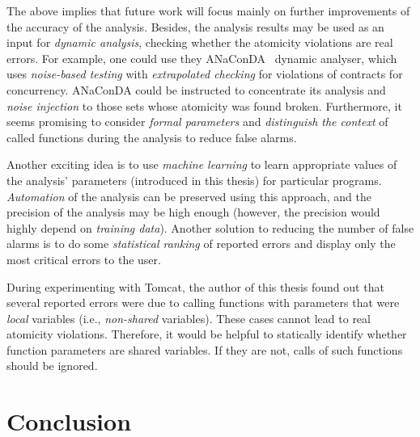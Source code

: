 The above implies that future work will focus mainly on further improvements of the accuracy of the analysis. Besides, the analysis results may be used as an input for \emph{dynamic analysis}, checking whether the atomicity violations are real errors. For example, one could use they ANaConDA~\cite{anaconda} dynamic analyser, which uses \emph{noise-based testing} with \emph{extrapolated checking} for violations of contracts for concurrency. ANaConDA could be instructed to concentrate its analysis and \emph{noise injection} to those sets whose atomicity was found broken. Furthermore, it seems promising to consider \emph{formal parameters} and \emph{distinguish the context} of called functions during the analysis to reduce false alarms.

Another exciting idea is to use \emph{machine learning} to learn appropriate values of the analysis' parameters (introduced in this thesis) for particular programs. \emph{Automation} of the analysis can be preserved using this approach, and the precision of the analysis may be high enough (however, the precision would highly depend on \emph{training data}). Another solution to reducing the number of false alarms is to do some \emph{statistical ranking} of reported errors and display only the most critical errors to the user.

During experimenting with Tomcat, the author of this thesis found out that several reported errors were due to calling functions with parameters that were \emph{local} variables (i.e., \emph{non-shared} variables). These cases cannot lead to real atomicity violations. Therefore, it would be helpful to statically identify whether function parameters are shared variables. If they are not, calls of such functions should be ignored.






\chapter{Conclusion}
\label{chap:conc}

\vspace{-.5em}

